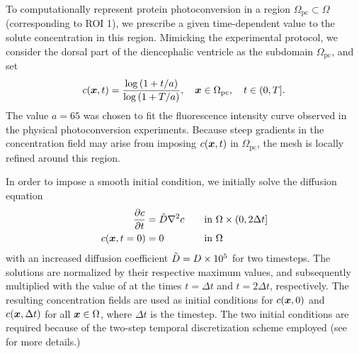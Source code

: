 \documentclass{WileyMSP-template}
\begin{document}
To computationally represent protein photoconversion in a region
$\Omega_{\mathrm{pc}} \subset \Omega$ (corresponding to ROI 1),
we prescribe a given time-dependent value to the solute concentration in this region. 
Mimicking the experimental protocol, we consider the dorsal part of the
diencephalic ventricle as the subdomain $\Omega_{\mathrm{pc}}$, and set
\begin{equation}
  c(\bm{x}, t)=\frac{\log{(1+t/a)}}{\log{(1+T/a)}},
  \quad \bm{x} \in \Omega_{\mathrm{pc}}, \quad t\in(0, T].
\label{eq:photoconversion_curve}
\end{equation}
The value $a=65$ was chosen to fit the fluorescence intensity curve
observed in the physical photoconversion experiments. Because steep gradients
in the concentration field may arise from imposing $c(\bm{x}, t)$ in $\Omega_{\mathrm{pc}}$,
the mesh is locally refined around this region.

In order to impose a smooth initial condition, we initially solve the diffusion equation
\begin{alignat*}{2}
\frac{\partial c}{\partial t} &= \Tilde{D}\nabla^2 c \quad &&\text{in } \Omega\times(0, 2\Delta t]\\
    c(\bm{x}, t=0) &= 0 \quad&&\text{in }\Omega
\end{alignat*}
with an increased diffusion coefficient $\Tilde{D}=D\times 10^{5}$ for two timesteps.
The solutions are normalized by their respective maximum values, and subsequently
multiplied with the value of  at the times $t=\Delta t$
and $t=2\Delta t$, respectively.
The resulting concentration fields are used as initial conditions for $c(\bm{x}, 0)$ and
$c(\bm{x}, \Delta t)$ for all $\bm{x}\in\Omega$, where $\Delta t$
is the timestep. The two initial conditions are required because of the
two-step temporal discretization scheme employed (see~ for more details.)
\end{document}
